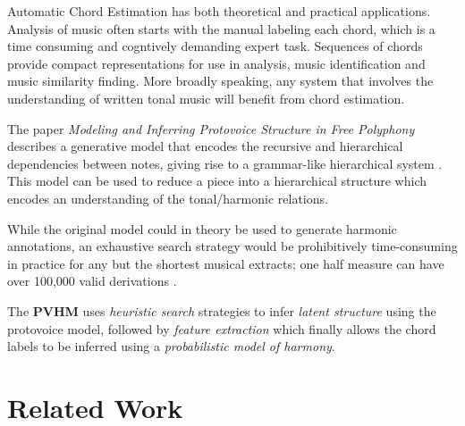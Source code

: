 \documentclass[12pt,a4paper,twoside,openright]{report}
\theoremstyle{definition}
\begin{document}
Automatic Chord Estimation has both theoretical and practical applications. 
Analysis of music often starts with the manual labeling each chord, which is a time consuming and cogntively demanding expert task. 
Sequences of chords provide compact representations for use in analysis, music identification and music similarity finding.
More broadly speaking, any system that involves the understanding of written tonal music will benefit from chord estimation. 

The paper \textit{Modeling and Inferring Protovoice Structure in Free Polyphony} describes a generative model that encodes the recursive and hierarchical dependencies between notes, giving rise to a grammar-like hierarchical system \cite{finkensiepModelingInferringProtovoice2021}.
This model can be used to reduce a piece into a hierarchical structure which encodes an understanding of the tonal/harmonic relations.




While the original model could in theory be used to generate harmonic annotations, an exhaustive search strategy would be prohibitively time-consuming in practice for any but the shortest musical extracts; one half measure can have over 100,000 valid derivations \cite{finkensiepStructureFreePolyphony2023}. 

The \textbf{PVHM} uses \textit{heuristic search} strategies to infer \textit{latent structure} using the protovoice model, followed by \textit{feature extraction} which finally allows the chord labels to be inferred using a \textit{probabilistic model of harmony}.

\section{Related Work}
\end{document}
